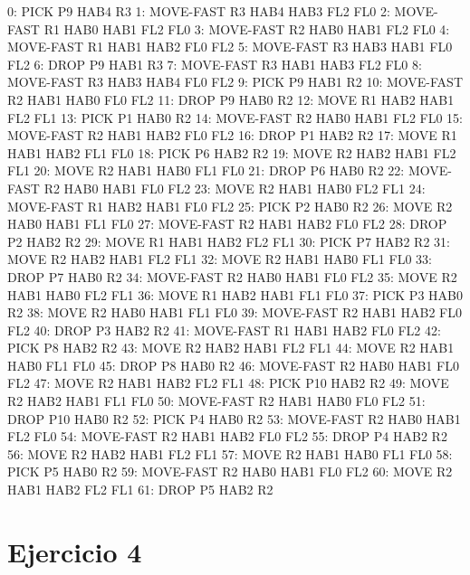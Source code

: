 \documentclass[	DIV=calc,%
							paper=a4,%
							fontsize=11pt]{scrartcl}	 					%
\begin{document}
\begin{bashcode}
	        0: PICK P9 HAB4 R3
	        1: MOVE-FAST R3 HAB4 HAB3 FL2 FL0
	        2: MOVE-FAST R1 HAB0 HAB1 FL2 FL0
	        3: MOVE-FAST R2 HAB0 HAB1 FL2 FL0
	        4: MOVE-FAST R1 HAB1 HAB2 FL0 FL2
	        5: MOVE-FAST R3 HAB3 HAB1 FL0 FL2
	        6: DROP P9 HAB1 R3
	        7: MOVE-FAST R3 HAB1 HAB3 FL2 FL0
	        8: MOVE-FAST R3 HAB3 HAB4 FL0 FL2
	        9: PICK P9 HAB1 R2
	       10: MOVE-FAST R2 HAB1 HAB0 FL0 FL2
	       11: DROP P9 HAB0 R2
	       12: MOVE R1 HAB2 HAB1 FL2 FL1
	       13: PICK P1 HAB0 R2
	       14: MOVE-FAST R2 HAB0 HAB1 FL2 FL0
	       15: MOVE-FAST R2 HAB1 HAB2 FL0 FL2
	       16: DROP P1 HAB2 R2
	       17: MOVE R1 HAB1 HAB2 FL1 FL0
	       18: PICK P6 HAB2 R2
	       19: MOVE R2 HAB2 HAB1 FL2 FL1
	       20: MOVE R2 HAB1 HAB0 FL1 FL0
	       21: DROP P6 HAB0 R2
	       22: MOVE-FAST R2 HAB0 HAB1 FL0 FL2
	       23: MOVE R2 HAB1 HAB0 FL2 FL1
	       24: MOVE-FAST R1 HAB2 HAB1 FL0 FL2
	       25: PICK P2 HAB0 R2
	       26: MOVE R2 HAB0 HAB1 FL1 FL0
	       27: MOVE-FAST R2 HAB1 HAB2 FL0 FL2
	       28: DROP P2 HAB2 R2
	       29: MOVE R1 HAB1 HAB2 FL2 FL1
	       30: PICK P7 HAB2 R2
	       31: MOVE R2 HAB2 HAB1 FL2 FL1
	       32: MOVE R2 HAB1 HAB0 FL1 FL0
	       33: DROP P7 HAB0 R2
	       34: MOVE-FAST R2 HAB0 HAB1 FL0 FL2
	       35: MOVE R2 HAB1 HAB0 FL2 FL1
	       36: MOVE R1 HAB2 HAB1 FL1 FL0
	       37: PICK P3 HAB0 R2
	       38: MOVE R2 HAB0 HAB1 FL1 FL0
	       39: MOVE-FAST R2 HAB1 HAB2 FL0 FL2
	       40: DROP P3 HAB2 R2
	       41: MOVE-FAST R1 HAB1 HAB2 FL0 FL2
	       42: PICK P8 HAB2 R2
	       43: MOVE R2 HAB2 HAB1 FL2 FL1
	       44: MOVE R2 HAB1 HAB0 FL1 FL0
	       45: DROP P8 HAB0 R2
	       46: MOVE-FAST R2 HAB0 HAB1 FL0 FL2
	       47: MOVE R2 HAB1 HAB2 FL2 FL1
	       48: PICK P10 HAB2 R2
	       49: MOVE R2 HAB2 HAB1 FL1 FL0
	       50: MOVE-FAST R2 HAB1 HAB0 FL0 FL2
	       51: DROP P10 HAB0 R2
	       52: PICK P4 HAB0 R2
	       53: MOVE-FAST R2 HAB0 HAB1 FL2 FL0
	       54: MOVE-FAST R2 HAB1 HAB2 FL0 FL2
	       55: DROP P4 HAB2 R2
	       56: MOVE R2 HAB2 HAB1 FL2 FL1
	       57: MOVE R2 HAB1 HAB0 FL1 FL0
	       58: PICK P5 HAB0 R2
	       59: MOVE-FAST R2 HAB0 HAB1 FL0 FL2
	       60: MOVE R2 HAB1 HAB2 FL2 FL1
	       61: DROP P5 HAB2 R2
\end{bashcode}

\section{Ejercicio 4}
\label{sec:Ejercicio 4}
\end{document}
